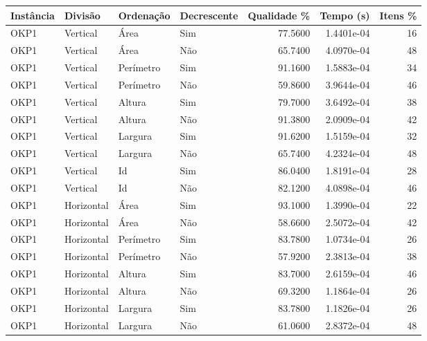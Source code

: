 \begin{tabular}{llllrrr}
    \hline
    Instância & Divisão     & Ordenação & Decrescente & Qualidade \% & Tempo (s)  & Itens \% \\
    \hline
    OKP1      & Vertical    & Área      & Sim         & 77.5600      & 1.4401e-04 & 16       \\
    OKP1      & Vertical    & Área      & Não         & 65.7400      & 4.0970e-04 & 48       \\
    OKP1      & Vertical    & Perímetro & Sim         & 91.1600      & 1.5883e-04 & 34       \\
    OKP1      & Vertical    & Perímetro & Não         & 59.8600      & 3.9644e-04 & 46       \\
    OKP1      & Vertical    & Altura    & Sim         & 79.7000      & 3.6492e-04 & 38       \\
    OKP1      & Vertical    & Altura    & Não         & 91.3800      & 2.0909e-04 & 42       \\
    OKP1      & Vertical    & Largura   & Sim         & 91.6200      & 1.5159e-04 & 32       \\
    OKP1      & Vertical    & Largura   & Não         & 65.7400      & 4.2324e-04 & 48       \\
    OKP1      & Vertical    & Id        & Sim         & 86.0400      & 1.8191e-04 & 28       \\
    OKP1      & Vertical    & Id        & Não         & 82.1200      & 4.0898e-04 & 46       \\
    OKP1      & Horizontal  & Área      & Sim         & 93.1000      & 1.3990e-04 & 22       \\
    OKP1      & Horizontal  & Área      & Não         & 58.6600      & 2.5072e-04 & 42       \\
    OKP1      & Horizontal  & Perímetro & Sim         & 83.7800      & 1.0734e-04 & 26       \\
    OKP1      & Horizontal  & Perímetro & Não         & 57.9200      & 2.3813e-04 & 38       \\
    OKP1      & Horizontal  & Altura    & Sim         & 83.7000      & 2.6159e-04 & 46       \\
    OKP1      & Horizontal  & Altura    & Não         & 69.3200      & 1.1864e-04 & 26       \\
    OKP1      & Horizontal  & Largura   & Sim         & 83.7800      & 1.1826e-04 & 26       \\
    OKP1      & Horizontal  & Largura   & Não         & 61.0600      & 2.8372e-04 & 48       \\

\end{tabular}
